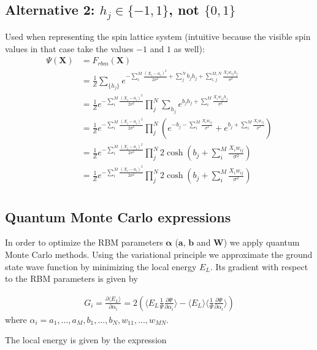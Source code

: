\documentclass[norsk,a4paper,11pt]{article}
\newcommand{\VW}{\mathbf{W}}
\newcommand{\Va}{\mathbf{a}}
\newcommand{\Vb}{\mathbf{b}}
\begin{document}
\subsection{Alternative 2: $h_j \in \{-1, 1\}$, not $\{0, 1\}$}
Used when representing the spin lattice system (intuitive because the visible spin values in that case take the values $-1$ and $1$ as well):
\begin{align}
\Psi (\mathbf{X}) &= F_{rbm}(\mathbf{X}) \\
&= \frac{1}{Z} \sum_{\{h_j\}} e^{-\sum_i^M \frac{(X_i - a_i)^2}{2\sigma^2} + \sum_j^N b_j h_j + \sum_{i,j}^{M,N} \frac{X_i w_{ij} h_j}{\sigma^2}} \\
&= \frac{1}{Z} e^{-\sum_i^M \frac{(X_i - a_i)^2}{2\sigma^2}} \prod_j^N \sum_{h_j}  e^{b_j h_j + \sum_i^M \frac{X_i w_{ij} h_j}{\sigma^2}} \\
&= \frac{1}{Z} e^{-\sum_i^M \frac{(X_i - a_i)^2}{2\sigma^2}} \prod_j^N ( e^{-b_j - \sum_i^M \frac{X_i w_{ij}}{\sigma^2}} + e^{b_j + \sum_i^M \frac{X_i w_{ij}}{\sigma^2}})  \\
&= \frac{1}{Z} e^{-\sum_i^M \frac{(X_i - a_i)^2}{2\sigma^2}} \prod_j^N 2\cosh(b_j + \sum_i^M \frac{X_i w_{ij}}{\sigma^2})\\
&= \frac{1}{Z} e^{-\sum_i^M \frac{(X_i - a_i)^2}{2\sigma^2}} \prod_j^N 2\cosh(b_j + \sum_i^M \frac{X_i w_{ij}}{\sigma^2}) \\
\end{align}

\subsection{Quantum Monte Carlo expressions}
In order to optimize the RBM parameters $\mathbf{\alpha}$ ($\Va$, $\Vb$ and $\VW$) we apply quantum Monte Carlo methods. Using the variational principle we approximate the ground state wave function by minimizing the local energy $E_L$. Its gradient with respect to the RBM parameters is given by \cite{jorgenthesis}

\begin{align}
	G_i = \frac{\partial \langle E_L \rangle}{\partial \alpha_i}
	= 2(\langle E_L \frac{1}{\Psi}\frac{\partial \Psi}{\partial \alpha_i} \rangle - \langle E_L \rangle \langle \frac{1}{\Psi}\frac{\partial \Psi}{\partial \alpha_i} \rangle )
\end{align}
where $\alpha_i = a_1,...,a_M,b_1,...,b_N,w_{11},...,w_{MN}$.

The local energy is given by the expression 
\end{document}
